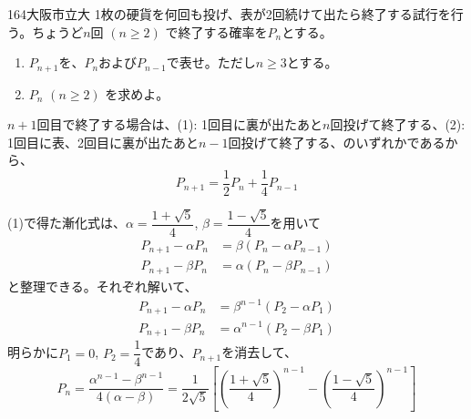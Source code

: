 \begin{prob}{164}{}{大阪市立大}
 1枚の硬貨を何回も投げ、表が2回続けて出たら終了する試行を行う。ちょうど$n$回 $(n\ge 2)$ で終了する確率を$P_n$とする。
 \begin{enumerate}
  \item $P_{n+1}$を、$P_n$および$P_{n-1}$で表せ。ただし$n\ge 3$とする。
  \item $P_n$ $(n\ge 2)$ を求めよ。
 \end{enumerate}
\end{prob}
$n+1$回目で終了する場合は、(1): 1回目に裏が出たあと$n$回投げて終了する、(2): 1回目に表、2回目に裏が出たあと$n-1$回投げて終了する、のいずれかであるから、
\[ P_{n+1}=\frac{1}{2}P_n+\frac{1}{4}P_{n-1} \]

(1)で得た漸化式は、$\alpha=\dfrac{1+\sqrt{5}}{4}$, $\beta=\dfrac{1-\sqrt{5}}{4}$を用いて
\begin{align*}
 P_{n+1}-\alpha P_n&=\beta(P_n-\alpha P_{n-1}) \\
 P_{n+1}-\beta P_n&=\alpha(P_n-\beta P_{n-1}) 
\end{align*}
と整理できる。それぞれ解いて、
\begin{align*}
 P_{n+1}-\alpha P_n&=\beta^{n-1}(P_2-\alpha P_1) \\
 P_{n+1}-\beta P_n&=\alpha^{n-1}(P_2-\beta P_1)
\end{align*}
明らかに$P_1=0$, $P_2=\dfrac{1}{4}$であり、$P_{n+1}$を消去して、
\[ P_n=\frac{\alpha^{n-1}-\beta^{n-1}}{4(\alpha-\beta)}=\frac{1}{2\sqrt{5}}\left[\left(\frac{1+\sqrt{5}}{4}\right)^{n-1}\!\!-\left(\frac{1-\sqrt{5}}{4}\right)^{n-1}\right] \]
